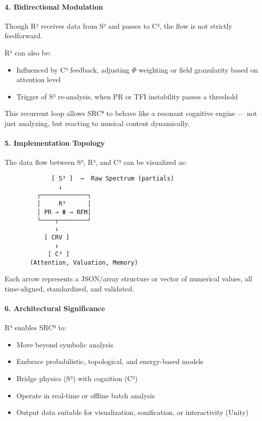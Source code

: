 \paragraph{4. Bidirectional Modulation}

Though R³ receives data from S³ and passes to C³, the flow is not strictly feedforward.

R³ can also be:

\begin{itemize}
    \item Influenced by C³ feedback, adjusting $\Phi$ weighting or field granularity based on attention level
    \item Trigger of S³ re-analysis, when PR or TFI instability passes a threshold
\end{itemize}

This recurrent loop allows SRC⁹ to behave like a resonant cognitive engine — not just analyzing, but reacting to musical content dynamically.

\paragraph{5. Implementation Topology}

The data flow between S³, R³, and C³ can be visualized as:

\begin{verbatim}
             [ S³ ]  →  Raw Spectrum (partials)
               ↓
         ┌─────────────┐
         │     R³      │
         │ PR → Φ → RFM│
         └────┬────────┘
              ↓
           [ CRV ]
              ↓
            [ C³ ]
       (Attention, Valuation, Memory)
\end{verbatim}

Each arrow represents a JSON/array structure or vector of numerical values, all time-aligned, standardized, and validated.

\paragraph{6. Architectural Significance}

R³ enables SRC⁹ to:

\begin{itemize}
    \item Move beyond symbolic analysis
    \item Embrace probabilistic, topological, and energy-based models
    \item Bridge physics (S³) with cognition (C³)
    \item Operate in real-time or offline batch analysis
    \item Output data suitable for visualization, sonification, or interactivity (Unity)
\end{itemize}

